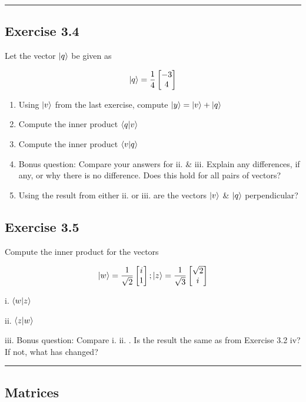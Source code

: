 \documentclass{book}
\begin{document}
\hrule

\subsection{Exercise 3.4}

Let the vector $\ket{q}$ be given as 

$$ \ket{q} = \frac{1}{4} \begin{bmatrix} -3 \\ 4 \end{bmatrix} $$

\begin{enumerate}[i]
    \item Using $\ket{v}$ from the last exercise, compute  $\ket{y} = \ket{v} + \ket{q} $
    \item Compute the inner product $ \braket{q | v} $
    \item Compute the inner product $ \braket{v | q} $ 
    \item Bonus question: Compare your answers for ii. \& iii. Explain any differences, if any, or why there is no difference. Does this hold for all pairs of vectors?
    \item Using the result from either ii. or iii. are the vectors $\ket{v}$ \& $\ket{q}$ perpendicular?
    
\end{enumerate}


\subsection{Exercise 3.5}

Compute the inner product for the vectors 

$$ \ket{w} = \frac{1}{\sqrt{2}} \begin{bmatrix} i \\ 1 \end{bmatrix} ; \ket{z} = \frac{1}{\sqrt{3}} \begin{bmatrix} \sqrt{2} \\ i \end{bmatrix}$$

i. $\braket{w|z}$

ii. $\braket{z|w}$

iii. Bonus question: Compare i. ii. . Is the result the same as from Exercise 3.2 iv? 
If not, what has changed?

\hrule

\subsection{ Matrices}
\end{document}
